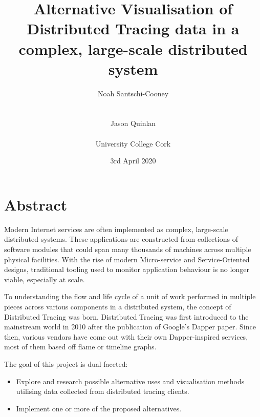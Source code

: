 \documentclass[12pt,pdftex,titlepage]{report}
\author{Noah Santschi-Cooney\\\\\\\small{Jason Quinlan}\\\\\small{University College Cork}}
\title{\textbf{Alternative Visualisation of Distributed Tracing data in a complex, large-scale distributed system}}
\date{\vfill\small{3rd April 2020}}
\begin{document}
    \maketitle    

    \chapter*{Abstract}
        Modern Internet services are often implemented as complex, large-scale distributed systems. These applications are constructed from collections 
        of software modules that could span many thousands of machines across multiple physical facilities. With the rise of modern Micro-service and 
        Service-Oriented designs, traditional tooling used to monitor application behaviour is no longer viable, especially at scale. 
        
        To understanding the flow and life cycle of a unit of work performed in multiple pieces across various components in a distributed system, the concept of 
        Distributed Tracing was born. Distributed Tracing was first introduced to the mainstream world in 2010 after the publication of Google’s Dapper
        paper. Since then, various vendors have come out with their own Dapper-inspired services, most of them based off flame or timeline graphs. 
        
        The goal of this project is dual-faceted:
        \begin{itemize}
            \item Explore and research possible alternative uses and visualisation methods utilising data collected from distributed tracing clients.
            \item Implement one or more of the proposed alternatives.
        \end{itemize}
\end{document}
